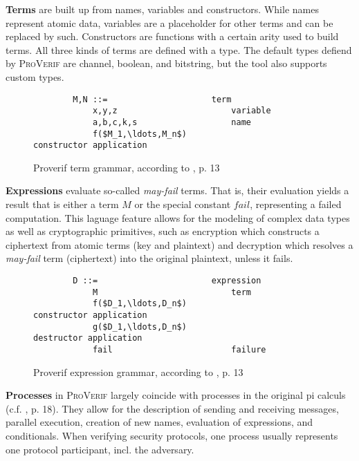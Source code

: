 \textbf{Terms} are built up from names, variables and constructors.
While names represent atomic data, variables are a placeholder for other terms and can be replaced by such.
Constructors are functions with a certain arity used to build terms.
All three kinds of terms are defined with a type.
The default types defiend by \textsc{ProVerif} are \textsf{channel}, \textsf{boolean}, and \textsf{bitstring}, but the tool also supports custom types.

\begin{figure}[h!]
    \centering
    \begin{lstlisting}
        M,N ::=                     term
            x,y,z                       variable
            a,b,c,k,s                   name
            f($M_1,\ldots,M_n$)                         constructor application
    \end{lstlisting}
    \caption{Proverif term grammar, according to \cite{blanchet2016modeling}, p. 13}
    \label{fig:pv-terms}
\end{figure}

\textbf{Expressions} evaluate so-called \textit{may-fail} terms.
That is, their evaluation yields a result that is either a term $M$ or the special constant $fail$, representing a failed computation.
This laguage feature allows for the modeling of complex data types as well as cryptographic primitives, such as encryption which constructs a ciphertext from atomic terms (key and plaintext) and decryption which resolves a \textit{may-fail} term (ciphertext) into the original plaintext, unless it fails.

\begin{figure}[h!]
    \centering
    \begin{lstlisting}
        D ::=                       expression
            M                           term
            f($D_1,\ldots,D_n$)                         constructor application
            g($D_1,\ldots,D_n$)                         destructor application
            fail                        failure
    \end{lstlisting}
    \caption{Proverif expression grammar, according to \cite{blanchet2016modeling}, p. 13}
    \label{fig:pv-expressions}
\end{figure}

\textbf{Processes} in \textsc{ProVerif} largely coincide with processes in the original pi calculs (c.f. \cite{blanchet2016modeling}, p. 18).
They allow for the description of sending and receiving messages, parallel execution, creation of new names, evaluation of expressions, and conditionals.
When verifying security protocols, one process usually represents one protocol participant, incl. the adversary.

